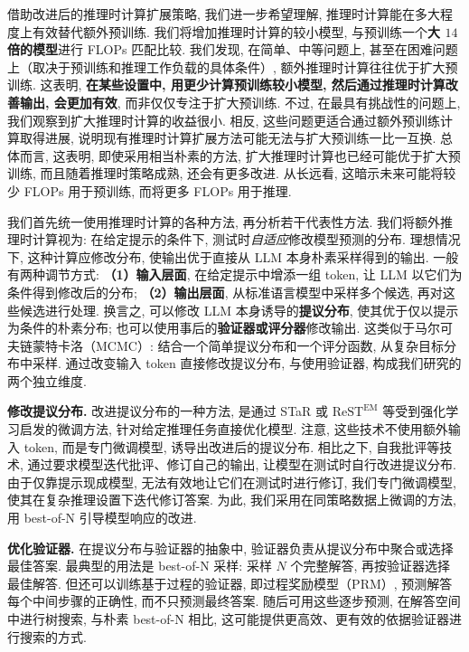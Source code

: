借助改进后的推理时计算扩展策略, 我们进一步希望理解, 推理时计算能在多大程度上有效替代额外预训练. 我们将增加推理时计算的较小模型, 与预训练一个\textbf{大 $14$ 倍的模型}进行 FLOPs 匹配比较. 我们发现, 在简单、中等问题上, 甚至在困难问题上（取决于预训练和推理工作负载的具体条件）, 额外推理时计算往往优于扩大预训练. 这表明, \textbf{在某些设置中, 用更少计算预训练较小模型, 然后通过推理时计算改善输出, 会更加有效}, 而非仅仅专注于扩大预训练. 不过, 在最具有挑战性的问题上, 我们观察到扩大推理时计算的收益很小. 相反, 这些问题更适合通过额外预训练计算取得进展, 说明现有推理时计算扩展方法可能无法与扩大预训练一比一互换. 总体而言, 这表明, 即使采用相当朴素的方法, 扩大推理时计算也已经可能优于扩大预训练, 而且随着推理时策略成熟, 还会有更多改进. 从长远看, 这暗示未来可能将较少 FLOPs 用于预训练, 而将更多 FLOPs 用于推理. 

我们首先统一使用推理时计算的各种方法, 再分析若干代表性方法. 我们将额外推理时计算视为: 在给定提示的条件下, 测试时\emph{自适应}修改模型预测的分布. 理想情况下, 这种计算应修改分布, 使输出优于直接从 LLM 本身朴素采样得到的输出. 一般有两种调节方式: \textbf{（1）输入层面}, 在给定提示中增添一组 token, 让 LLM 以它们为条件得到修改后的分布; \textbf{（2）输出层面}, 从标准语言模型中采样多个候选, 再对这些候选进行处理. 换言之, 可以修改 LLM 本身诱导的\textbf{提议分布}, 使其优于仅以提示为条件的朴素分布; 也可以使用事后的\textbf{验证器或评分器}修改输出. 这类似于马尔可夫链蒙特卡洛（MCMC）\cite{testcompute-andrieu2003introduction}: 结合一个简单提议分布和一个评分函数, 从复杂目标分布中采样. 通过改变输入 token 直接修改提议分布, 与使用验证器, 构成我们研究的两个独立维度. 

\textbf{修改提议分布. }改进提议分布的一种方法, 是通过 STaR 或 $\text{ReST}^{\text{EM}}$ 等受到强化学习启发的微调方法\cite{testcompute-zelikman2022star,testcompute-singh2024human}, 针对给定推理任务直接优化模型. 注意, 这些技术不使用额外输入 token, 而是专门微调模型, 诱导出改进后的提议分布. 相比之下, 自我批评等技术\cite{testcompute-bai2022constitutional,testcompute-madaan2023selfrefine,testcompute-du2023improving,testcompute-saunders2022selfcritiquing}, 通过要求模型迭代批评、修订自己的输出, 让模型在测试时自行改进提议分布. 由于仅靠提示现成模型, 无法有效地让它们在测试时进行修订, 我们专门微调模型, 使其在复杂推理设置下迭代修订答案. 为此, 我们采用在同策略数据上微调的方法, 用 best-of-N 引导模型响应的改进\cite{testcompute-qu2024recursive}. 

\textbf{优化验证器. }在提议分布与验证器的抽象中, 验证器负责从提议分布中聚合或选择最佳答案. 最典型的用法是 best-of-N 采样: 采样 $N$ 个完整解答, 再按验证器选择最佳解答\cite{testcompute-cobbe2021training}. 但还可以训练基于过程的验证器\cite{testcompute-lightman2023lets}, 即过程奖励模型（PRM）, 预测解答每个中间步骤的正确性, 而不只预测最终答案. 随后可用这些逐步预测, 在解答空间中进行树搜索, 与朴素 best-of-N 相比, 这可能提供更高效、更有效的依据验证器进行搜索的方式\cite{testcompute-yao2023tree,testcompute-feng2024alphazerolike,testcompute-chen2024alphamath}. 

